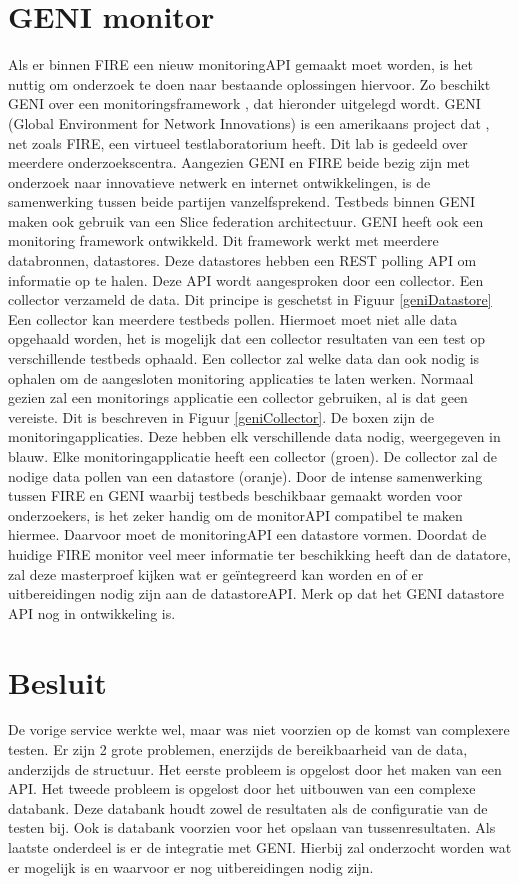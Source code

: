 \section{GENI monitor}
\npar
Als er binnen FIRE een nieuw monitoringAPI gemaakt moet worden, is het nuttig om onderzoek te doen naar bestaande oplossingen hiervoor. Zo beschikt GENI over een monitoringsframework \citep{geni-monitor}, dat hieronder uitgelegd wordt.
\npar
GENI (Global Environment for Network Innovations) is een amerikaans project dat , net zoals FIRE, een virtueel testlaboratorium heeft. Dit lab is gedeeld over meerdere onderzoekscentra. Aangezien GENI en FIRE beide bezig zijn met onderzoek naar innovatieve netwerk en internet ontwikkelingen, is de samenwerking tussen beide partijen vanzelfsprekend.
\npar
Testbeds binnen GENI maken ook gebruik van een Slice federation architectuur. GENI heeft ook een monitoring framework ontwikkeld. Dit framework werkt met meerdere databronnen, datastores. Deze datastores hebben een REST polling API om informatie op te halen. Deze API wordt aangesproken door een collector. Een collector verzameld de data. Dit principe is geschetst in Figuur \ref{geniDatastore}
\npar
Een collector kan meerdere testbeds pollen. Hiermoet moet niet alle data opgehaald worden, het is mogelijk dat een collector resultaten van een test op verschillende testbeds ophaald. Een collector zal welke data dan ook nodig is ophalen om de aangesloten monitoring applicaties te laten werken. Normaal gezien zal een monitorings applicatie een collector gebruiken, al is dat geen vereiste. Dit is beschreven in Figuur \ref{geniCollector}. De boxen zijn de monitoringapplicaties. Deze hebben elk verschillende data nodig, weergegeven in blauw. Elke monitoringapplicatie heeft een collector (groen). De collector zal de nodige data pollen van een datastore (oranje).
\clearpage
\npar
Door de intense samenwerking tussen FIRE en GENI waarbij testbeds beschikbaar gemaakt worden voor onderzoekers, is het zeker handig om de monitorAPI compatibel te maken hiermee. Daarvoor moet de monitoringAPI een datastore vormen. Doordat de huidige FIRE monitor veel meer informatie ter beschikking heeft dan de datatore, zal deze masterproef kijken wat er geïntegreerd kan worden en of er uitbereidingen nodig zijn aan de datastoreAPI. Merk op dat het GENI datastore API nog in ontwikkeling is.
\section{Besluit}
De vorige service werkte wel, maar was niet voorzien op de komst van complexere testen. Er zijn 2 grote problemen, enerzijds de bereikbaarheid van de data, anderzijds de structuur. Het eerste probleem is opgelost door het maken van een API. Het tweede probleem is opgelost door het uitbouwen van een complexe databank. Deze databank houdt zowel de resultaten als de configuratie van de testen bij. Ook is databank voorzien voor het opslaan van tussenresultaten. Als laatste onderdeel is er de integratie met GENI. Hierbij zal onderzocht worden wat er mogelijk is en waarvoor er nog uitbereidingen nodig zijn.
